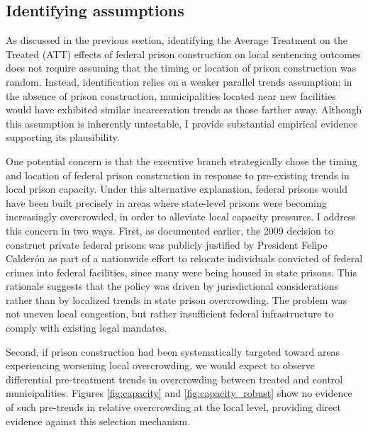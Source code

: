 \subsection*{Identifying assumptions}

As discussed in the previous section, identifying the Average Treatment on the Treated (ATT) effects of federal prison construction on local sentencing outcomes does not require assuming that the timing or location of prison construction was random. Instead, identification relies on a weaker parallel trends assumption: in the absence of prison construction, municipalities located near new facilities would have exhibited similar incarceration trends as those farther away. Although this assumption is inherently untestable, I provide substantial empirical evidence supporting its plausibility.

One potential concern is that the executive branch strategically chose the timing and location of federal prison construction in response to pre-existing trends in local prison capacity. Under this alternative explanation, federal prisons would have been built precisely in areas where state-level prisons were becoming increasingly overcrowded, in order to alleviate local capacity pressures. I address this concern in two ways. First, as documented earlier, the 2009 decision to construct private federal prisons was publicly justified by President Felipe Calderón as part of a nationwide effort to relocate individuals convicted of federal crimes into federal facilities, since many were being housed in state prisons. This rationale suggests that the policy was driven by jurisdictional considerations rather than by localized trends in state prison overcrowding. The problem was not uneven local congestion, but rather insufficient federal infrastructure to comply with existing legal mandates.

Second, if prison construction had been systematically targeted toward areas experiencing worsening local overcrowding, we would expect to observe differential pre-treatment trends in overcrowding between treated and control municipalities. Figures \ref{fig:capacity} and \ref{fig:capacity_robust} show no evidence of such pre-trends in relative overcrowding at the local level, providing direct evidence against this selection mechanism.


